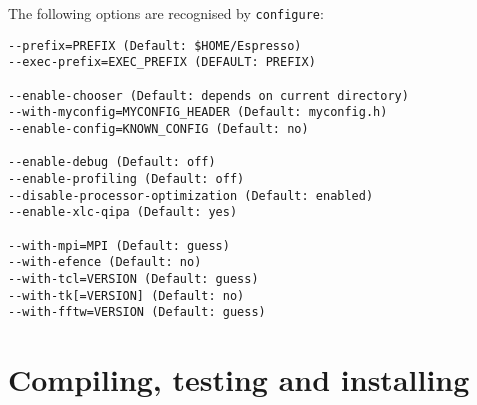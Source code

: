 The following options are recognised by \texttt{configure}:
\begin{verbatim}
--prefix=PREFIX (Default: $HOME/Espresso)
--exec-prefix=EXEC_PREFIX (DEFAULT: PREFIX)

--enable-chooser (Default: depends on current directory)
--with-myconfig=MYCONFIG_HEADER (Default: myconfig.h)
--enable-config=KNOWN_CONFIG (Default: no)

--enable-debug (Default: off)
--enable-profiling (Default: off)
--disable-processor-optimization (Default: enabled)
--enable-xlc-qipa (Default: yes)

--with-mpi=MPI (Default: guess)
--with-efence (Default: no)
--with-tcl=VERSION (Default: guess)
--with-tk[=VERSION] (Default: no)
--with-fftw=VERSION (Default: guess)
\end{verbatim}

\section{Compiling, testing and installing \es}
\label{sec:make}

